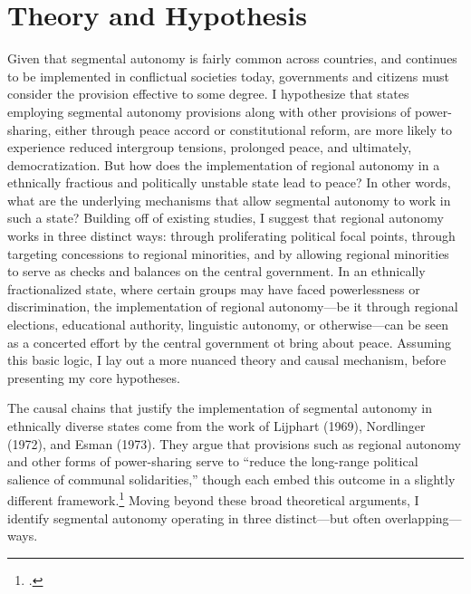 \documentclass[12pt]{article}
\begin{document}
\section{Theory and Hypothesis}
Given that segmental autonomy is fairly common across countries, and continues to be implemented in conflictual societies today, governments and citizens must consider the provision effective to some degree. I hypothesize that states employing segmental autonomy provisions along with other provisions of power-sharing, either through peace accord or constitutional reform, are more likely to experience reduced intergroup tensions, prolonged peace, and ultimately, democratization. But how does the implementation of regional autonomy in a ethnically fractious and politically unstable state lead to peace? In other words, what are the underlying mechanisms that allow segmental autonomy to work in such a state? Building off of existing studies, I suggest that regional autonomy works in three distinct ways: through proliferating political focal points, through targeting concessions to regional minorities, and by allowing regional minorities to serve as checks and balances on the central government. In an ethnically fractionalized state, where certain groups may have faced powerlessness or discrimination, the implementation of regional autonomy---be it through regional elections, educational authority, linguistic autonomy, or otherwise---can be seen as a concerted effort by the central government ot bring about peace. Assuming this basic logic, I lay out a more nuanced theory and causal mechanism, before presenting my core hypotheses. 

The causal chains that justify the implementation of segmental autonomy in ethnically diverse states come from the work of Lijphart (1969), Nordlinger (1972), and Esman (1973). They argue that provisions such as regional autonomy and other forms of power-sharing serve to ``reduce the long-range political salience of communal solidarities,'' though each embed this outcome in a slightly different framework.\footcite[55]{esman_management_1973} Moving beyond these broad theoretical arguments, I identify segmental autonomy operating in three distinct---but often overlapping---ways. 
\end{document}
